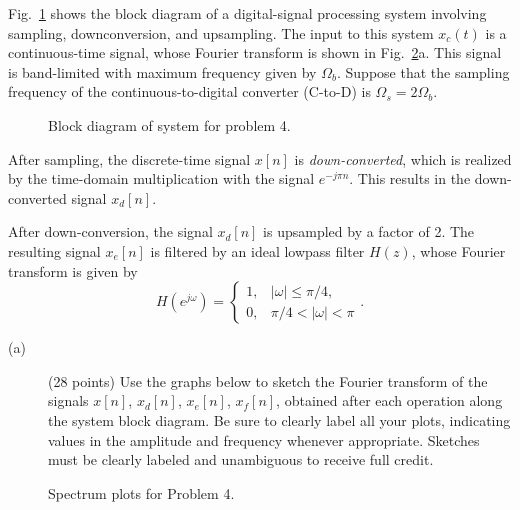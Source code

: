 \documentclass[10pt]{article}
\begin{document}
Fig.~\ref{fig:sampling_diagram} shows the block diagram of a digital-signal processing system involving sampling, downconversion, and upsampling. The input to this system $x_c(t)$ is a continuous-time signal, whose Fourier transform is shown in Fig.~\ref{fig:sampling_spectrum}a. This signal is band-limited with maximum frequency given by $\Omega_b$. Suppose that the sampling frequency of the continuous-to-digital converter (C-to-D) is $\Omega_s = 2\Omega_b$. 

\begin{figure}[!h]
	\centering
	\resizebox{\textwidth}{!}{} 
	\caption{Block diagram of system for problem 4.}\label{fig:sampling_diagram}
\end{figure}


After sampling, the discrete-time signal $x[n]$ is \textit{down-converted}, which is realized by the time-domain multiplication with the signal $e^{-j\pi n}$. This results in the down-converted signal $x_d[n]$. 

After down-conversion, the signal $x_d[n]$ is upsampled by a factor of 2. The resulting signal $x_e[n]$ is filtered by an ideal lowpass filter $H(z)$, whose Fourier transform is given by
\begin{equation}
	H(e^{j\omega}) = \begin{cases}
	1, &|\omega| \leq \pi/4, \\
	0, & \pi/4 < |\omega| < \pi
	\end{cases}.
\end{equation}

\begin{description}
\item[(a)] (28 points) Use the graphs below to sketch the Fourier transform of the signals $x[n]$, $x_d[n]$, $x_e[n]$, $x_f[n]$, obtained after each operation along the system block diagram. Be sure to clearly label all your plots, indicating values in the amplitude and frequency whenever appropriate. Sketches must be clearly labeled and unambiguous to receive full credit. 
\end{description}
\begin{figure}[!h]
\centering
	\resizebox{0.87\textwidth}{!}{}
    \caption{Spectrum plots for Problem 4.} \label{fig:sampling_spectrum}
\end{figure}
\end{document}

